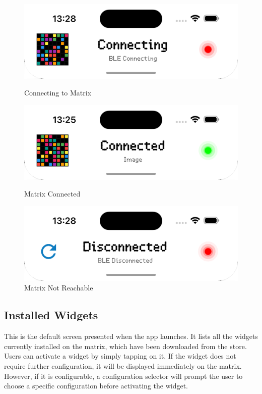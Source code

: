 \begin{figure}[h]
    \centering
    \begin{minipage}[b]{0.32\textwidth}
        \centering
        \includegraphics[width=\textwidth]{tesi/img/matrix_status_notch/connecting.png}
        \caption*{Connecting to Matrix}
    \end{minipage}
    \begin{minipage}[b]{0.32\textwidth}
        \centering
        \includegraphics[width=\textwidth]{tesi/img/matrix_status_notch/connected.png}
        \caption*{Matrix Connected}
    \end{minipage}
    \begin{minipage}[b]{0.32\textwidth}
        \centering
        \includegraphics[width=\textwidth]{tesi/img/matrix_status_notch/disconnected.png}
        \caption*{Matrix Not Reachable}
    \end{minipage}
\end{figure}

\newpage

\subsection{Installed Widgets}
This is the default screen presented when the app launches. It lists all the widgets currently installed on the matrix, which have been downloaded from the store. Users can activate a widget by simply tapping on it. If the widget does not require further configuration, it will be displayed immediately on the matrix. However, if it is configurable, a configuration selector will prompt the user to choose a specific configuration before activating the widget.

